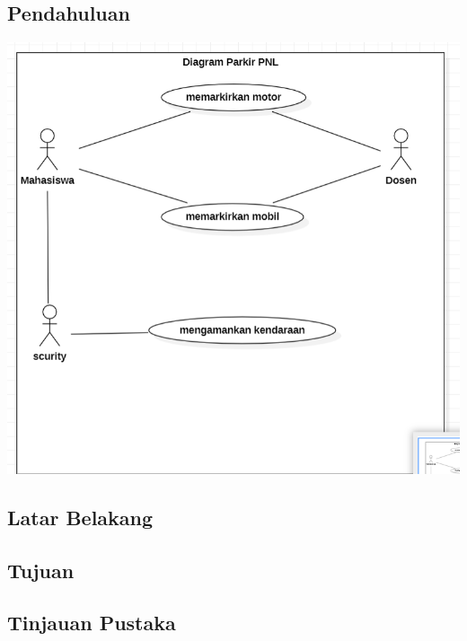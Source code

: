 \begin{multicols}{2}
\tableofcontents
\section{Pendahuluan}
\lipsum[1]\cite{Bowker1985}

\includegraphics[scale=.5]{gambar/gambar1}

\subsection{Latar Belakang}
\lipsum[1]
\subsection{Tujuan}
\lipsum[1]
\subsection{Tinjauan Pustaka}
\lipsum[1]
\end{multicols}